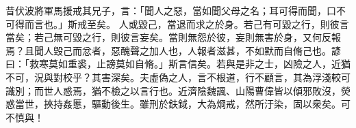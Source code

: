 \begin{pinyinscope}
 
昔伏波將軍馬援戒其兄子，言：「聞人之惡，當如聞父母之名；耳可得而聞，口不可得而言也。」斯戒至矣。
 人或毀己，當退而求之於身。若己有可毀之行，則彼言當矣；若己無可毀之行，則彼言妄矣。當則無怨於彼，妄則無害於身，又何反報焉？且聞人毀己而忿者，惡醜聲之加人也，人報者滋甚，不如默而自脩己也。諺曰：「救寒莫如重裘，止謗莫如自脩。」斯言信矣。若與是非之士，凶險之人，近猶不可，況與對校乎？其害深矣。夫虛偽之人，言不根道，行不顧言，其為浮淺較可識別；而世人惑焉，猶不檢之以言行也。近濟陰魏諷、山陽曹偉皆以傾邪敗沒，熒惑當世，挾持姦慝，驅動後生。雖刑於鈇鉞，大為烱戒，然所汙染，固以衆矣。可不慎與！
 

\end{pinyinscope}
